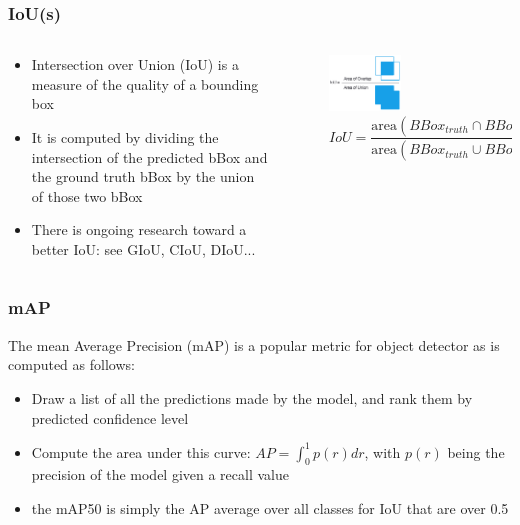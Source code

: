 \documentclass[aspectratio=169]{beamer}
\begin{document}
\begin{frame}
	\frametitle{IoU(s)}
	\begin{columns}[T]
		\begin{column}{.48\textwidth}
		\begin{itemize}
			\item Intersection over Union (IoU) is a measure of the quality of a bounding box
			\item It is computed by dividing the intersection of the predicted bBox and the ground truth bBox by the union of those two bBox
			\item There is ongoing research toward a better IoU: see GIoU, CIoU, DIoU...
		\end{itemize}
		\end{column}
		\hfill
		\begin{column}{.48\textwidth}
		\begin{figure}
		  \centering
			\includegraphics[width=0.5\textwidth]{iou}
		  \label{}
			\begin{equation}
				IoU = \frac{\text{area}(BBox_{truth} \cap BBox_{pred})}{\text{area}(BBox_{truth} \cup BBox_{pred})}
			\end{equation}
		\end{figure}
		\end{column}
		\end{columns}
\end{frame}

\begin{frame}
	\frametitle{mAP}
		The mean Average Precision (mAP) is a popular metric for object detector as is computed as follows:
		\begin{itemize}
			\item Draw a list of all the predictions made by the model, and rank them by predicted confidence level
			\item Compute the area under this curve: $AP = \int_0^1 p(r) dr$, with $p(r)$ being the precision of the model given a recall value
			\item the mAP\@50 is simply the AP average over all classes for IoU that are over 0.5
		\end{itemize}
\end{frame}
\end{document}
